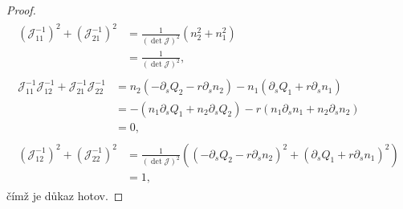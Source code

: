 \begin{proof}
    \begin{align}
        \begin{split}\label{Vnitřní rozvoj: důkaz vzorec 1}
        \left(\mathcal{J}^{-1}_{11}\right)^2 + \left(\mathcal{J}^{-1}_{21}\right)^2 &= \frac{1}{\left(\det \mathcal{J}\right)^2} (n_2^2 + n_1^2)\\
        &= \frac{1}{\left(\det \mathcal{J}\right)^2},
        \end{split}\\
        \begin{split}\label{Vnitřní rozvoj: důkaz vzorec 2}
            \mathcal{J}^{-1}_{11}\mathcal{J}^{-1}_{12} + \mathcal{J}^{-1}_{21}\mathcal{J}^{-1}_{22} &= n_2 \left(-\partial_s Q_2 - r \partial_s n_2\right) - n_1 (\partial_s Q_1 + r \partial_s n_1)\\
            &=-(n_1 \partial_s Q_1 + n_2 \partial_s Q_2) -r (n_1 \partial_s n_1 + n_2 \partial_s n_2)\\
            &= 0,
        \end{split}\\
        \begin{split}\label{Vnitřní rozvoj: důkaz vzorec 3}
            \left(\mathcal{J}^{-1}_{12}\right)^2 + \left(\mathcal{J}^{-1}_{22}\right)^2 &= \frac{1}{\left(\det \mathcal{J}\right)^2}\left( (-\partial_s Q_2 - r \partial_s n_2)^2 + (\partial_s Q_1 + r \partial_s n_1)^2 \right)\\
            &=1,
        \end{split}
    \end{align}
    čímž je důkaz hotov.
\end{proof}

